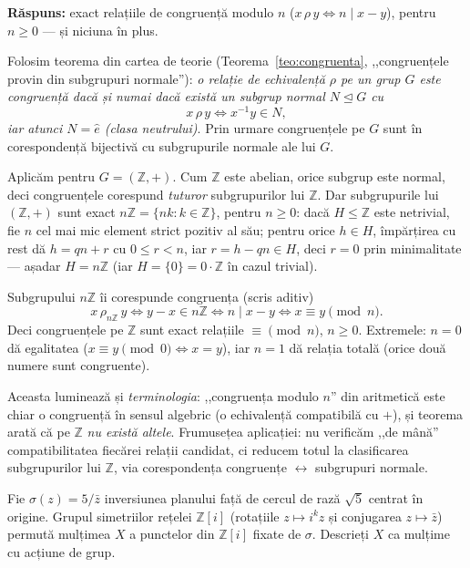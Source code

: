 \noindent\textbf{Răspuns:} exact relațiile de congruență
modulo $n$ ($x\,\rho\,y\iff n\mid x-y$), pentru $n\ge 0$ --- și niciuna
în plus.

\begin{solutie}
Folosim teorema din cartea de teorie (Teorema~\ref{teo:congruenta}, ,,congruențele
provin din subgrupuri normale''): \emph{o relație de echivalență
$\rho$ pe un grup $G$ este congruență dacă și numai dacă
există un subgrup normal $N\trianglelefteq G$ cu
\[
  x\,\rho\,y \iff x^{-1}y\in N ,
\]
iar atunci $N=\widehat e$ (clasa neutrului)}. Prin urmare congruențele pe
$G$ sunt în corespondență bijectivă cu subgrupurile normale
ale lui $G$.

Aplicăm pentru $G=(\mathbb{Z},+)$. Cum $\mathbb{Z}$ este abelian, orice
subgrup este normal, deci congruențele corespund \emph{tuturor}
subgrupurilor lui $\mathbb{Z}$. Dar subgrupurile lui $(\mathbb{Z},+)$ sunt
exact $n\mathbb{Z}=\{nk : k\in\mathbb{Z}\}$, pentru $n\ge 0$: dacă
$H\le\mathbb{Z}$ este netrivial, fie $n$ cel mai mic element strict pozitiv
al său; pentru orice $h\in H$, împărțirea cu rest dă
$h=qn+r$ cu $0\le r<n$, iar $r=h-qn\in H$, deci $r=0$ prin minimalitate ---
așadar $H=n\mathbb{Z}$ (iar $H=\{0\}=0\cdot\mathbb{Z}$ în cazul
trivial).

Subgrupului $n\mathbb{Z}$ îi corespunde congruența (scris aditiv)
\[
  x\,\rho_{n\mathbb{Z}}\,y \iff y-x\in n\mathbb{Z} \iff n\mid x-y \iff x\equiv y \pmod n .
\]
Deci congruențele pe $\mathbb{Z}$ sunt exact relațiile $\equiv\!\!\pmod n$,
$n\ge 0$. Extremele: $n=0$ dă egalitatea ($x\equiv y\pmod 0\iff x=y$), iar
$n=1$ dă relația totală (orice două numere sunt congruente).
\end{solutie}

\begin{obs}
Aceasta luminează și \emph{terminologia}: ,,congruența modulo $n$''
din aritmetică este chiar o congruență în sensul algebric (o
echivalență compatibilă cu $+$), și teorema arată că
pe $\mathbb{Z}$ \emph{nu există altele}. Frumusețea aplicației: nu
verificăm ,,de mână'' compatibilitatea fiecărei relații
candidat, ci reducem totul la clasificarea subgrupurilor lui $\mathbb{Z}$,
via corespondența congruențe $\leftrightarrow$ subgrupuri normale.
\end{obs}

\begin{problema}
Fie $\sigma(z)=5/\bar z$ inversiunea planului față de cercul de
rază $\sqrt5$ centrat în origine. Grupul simetriilor rețelei
$\mathbb{Z}[i]$ (rotațiile $z\mapsto i^{k}z$ și conjugarea
$z\mapsto\bar z$) permută mulțimea $X$ a punctelor din $\mathbb{Z}[i]$
fixate de $\sigma$. Descrieți $X$ ca mulțime cu acțiune de grup.
\end{problema}

